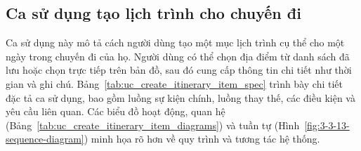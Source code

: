 \subsection{Ca sử dụng tạo lịch trình cho chuyến đi}
\noindent Ca sử dụng này mô tả cách người dùng tạo một mục lịch trình cụ thể cho một ngày trong chuyến đi của họ. Người dùng có thể chọn địa điểm từ danh sách đã lưu hoặc chọn trực tiếp trên bản đồ, sau đó cung cấp thông tin chi tiết như thời gian và ghi chú. Bảng~\ref{tab:uc_create_itinerary_item_spec} trình bày chi tiết đặc tả ca sử dụng, bao gồm luồng sự kiện chính, luồng thay thế, các điều kiện và yêu cầu liên quan. Các biểu đồ hoạt động, quan hệ (Bảng~\ref{tab:uc_create_itinerary_item_diagrams}) và tuần tự (Hình~\ref{fig:3-3-13-sequence-diagram}) minh họa rõ hơn về quy trình và tương tác hệ thống.

